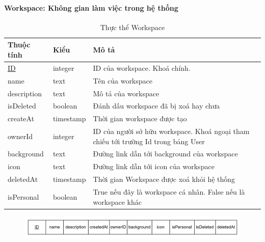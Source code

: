 \paragraph{Workspace: Không gian làm việc trong hệ thống}
\begin{center}

\begin{table}[!h]
        \begin{tabular}{ |p{2cm} |p{3cm} |p{9cm}|} 
                \hline
                   Thuộc tính & Kiểu & Mô tả \\ [0.5ex] 
                \hline
                \underline{ID} & integer & ID của workspace. Khoá chính. \\ 
                \hline
                name & text & Tên của workspace \\
                \hline
                description & text & Mô tả của workspace \\
                \hline
                isDeleted & boolean & Đánh dấu workspace đã bị xoá hay chưa \\
                \hline
                createAt & timestamp & Thời gian workspace được tạo \\
                \hline
                ownerId & integer & ID của người sở hữu workspace.
                Khoá ngoại tham chiếu tới trường Id trong bảng User \\
                \hline
                background & text & Đường link dẫn tới background của workspace \\
                \hline
                icon & text & Đường link dẫn tới icon của workspace \\
                \hline
                deletedAt & timestamp & Thời gian Workspace được xoá khỏi hệ thống \\
                \hline
                isPersonal & boolean & True nếu đây là workspace cá nhân. False nếu là workspace khác \\
                \hline
               \end{tabular}
                 \caption{Thực thể Workspace}
\end{table}
\end{center}
\begin{figure}[H]
        \centering
        \includegraphics[width=\textwidth]{Content/Phân tích và thiết kế hệ thống/images/ERD_mapping/workspace_mapping.png}
        \label{fig:Thực thể Workspace}
\end{figure}

